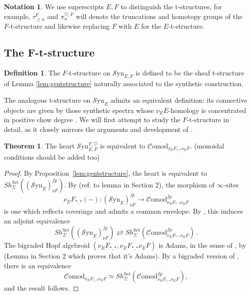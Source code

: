 \documentclass[10pt]{amsart}
\theoremstyle{definition}
\numberwithin{figure}{section}
\numberwithin{equation}{section}
\newtheorem{theorem}[figure]{Theorem}
\newtheorem{definition}[figure]{Definition}
\newtheorem{notation}[figure]{Notation}
\theoremstyle{cited}
\newcommand{\Syn}{\mathcal{S}\mathrm{yn}}
\newcommand{\Comod}{\mathcal{C}\mathrm{omod}}
\begin{document}
\begin{notation}
  We use superscripts $E,F$ to distinguish the t-structures, for example, $\tau_{\geq n}^F$ and $\pi_n^{\heartsuit,F}$ will denote the truncations and homotopy groups of the $F$-t-structure and likewise replacing $F$ with $E$ for the $E$-t-structure.
\end{notation}

\subsection{The F-t-structure}

\begin{definition}
  The $F$-t-structure on $\Syn_{E,F}$ is defined to be the sheaf t-structure of Lemma \ref{lem:gentstructure} naturally associated to the synthetic construction.
\end{definition}

The analogous t-structure on $\Syn_E$ admits an equivalent definition: its connective objects are given by those synthetic spectra whose $\nu_EE$-homology is concentrated in positive chow degree \cite[Cor. 4.19]{Pst22}. We will first attempt to study the $F$-t-structure in detail, as it closely mirrors the arguments and development of \cite{Pst22}.

\begin{theorem}
      The heart $\Syn_{E,F}^{F,\heartsuit}$ is equivalent to $\Comod_{\nu_EF_{*,*}\nu_EF}$. (monoidal conditions should be added too)
\end{theorem}
  
\begin{proof}
      By Proposition~\ref{lem:gentstructure}, the heart is equivalent to $Sh_{\Sigma}^{\mathrm{Set}}((\Syn_E)_{\nu F}^{fp})$. By (ref. to lemma in Section 2), the morphism of $\infty$-sites $$\nu_EF_{*,*}(-):(\Syn_E)_{\nu F}^{fp}\to\Comod_{\nu_EF_{*,*}\nu_EF}^{fp}$$ is one which reflects coverings and admits a common envelope. By \cite[Rem. 2.50]{Pst22}, this induces an adjoint equivalence $$Sh_{\Sigma}^{\mathrm{Set}}((\Syn_E)_{\nu F}^{fp})\rightleftarrows Sh_{\Sigma}^{\mathrm{Set}}(\Comod_{\nu_EF_{*,*}\nu_EF}^{fp})\,.$$
  The bigraded Hopf algebroid $(\nu_EF_{*,*},\nu_EF_{*,*}\nu_EF)$ is Adams, in the sense of \cite[Def. 3.1]{Pst22}, by (Lemma in Section 2 which proves that it's Adams). By a bigraded version of \cite[2.1.12]{GH05}, \cite[Thm. 3.2]{Pst22} there is an equivalence
  $$
  \Comod_{\nu_EF_{*,*}\nu_EF}\simeq Sh_{\Sigma}^{\mathrm{Set}}(\Comod_{\nu_EF_{*,*}\nu_EF}^{fp}),
  $$
  and the result follows.
  \end{proof}
  
\end{document}
